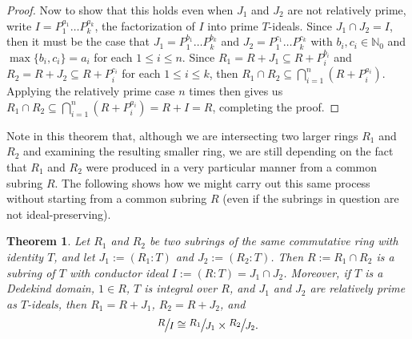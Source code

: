 \documentclass[12pt]{amsart}
\newtheorem{theorem}{Theorem}[section]
\theoremstyle{definition}
\newcommand{\bN}{\mathbb N}
\newcommand{\quot}[2]{\large\sfrac{#1}{#2}\normalsize}
\begin{document}
\begin{proof}
		Now to show that this holds even when $J_1$ and $J_2$ are not relatively prime, write $I=P_1^{a_1}\dots P_k^{a_k}$, the factorization of $I$ into prime $T$-ideals. Since $J_1\cap J_2=I$, then it must be the case that $J_1=P_1^{b_1}\dots P_k^{b_k}$ and $J_2=P_1^{c_1}\dots P_k^{c_k}$ with $b_i,c_i\in\bN_0$ and $\max\{b_i,c_i\}=a_i$ for each $1\leq i\leq n$. Since $R_1=R+J_1\subseteq R+P_i^{b_i}$ and $R_2=R+J_2\subseteq R+P_i^{c_i}$ for each $1\leq i\leq k$, then $R_1\cap R_2\subseteq \bigcap_{i=1}^n(R+P_i^{a_i})$. Applying the relatively prime case $n$ times then gives us $R_1\cap R_2\subseteq \bigcap_{i=1}^n(R+P_i^{a_i})=R+I=R$, completing the proof.
	\end{proof}
	
	Note in this theorem that, although we are intersecting two larger rings $R_1$ and $R_2$ and examining the resulting smaller ring, we are still depending on the fact that $R_1$ and $R_2$ were produced in a very particular manner from a common subring $R$. The following shows how we might carry out this same process without starting from a common subring $R$ (even if the subrings in question are not ideal-preserving).
	
	\begin{theorem}
		Let $R_1$ and $R_2$ be two subrings of the same commutative ring with identity $T$, and let $J_1:=(R_1:T)$ and $J_2:=(R_2:T)$. Then $R:=R_1\cap R_2$ is a subring of $T$ with conductor ideal $I:=(R:T)=J_1\cap J_2$. Moreover, if $T$ is a Dedekind domain, $1\in R$, $T$ is integral over $R$, and $J_1$ and $J_2$ are relatively prime as $T$-ideals, then $R_1=R+J_1$, $R_2=R+J_2$, and $$\quot{R}{I}\cong\quot{R_1}{J_1}\times \quot{R_2}{J_2}.$$ 
	\end{theorem}
	
\end{document}
